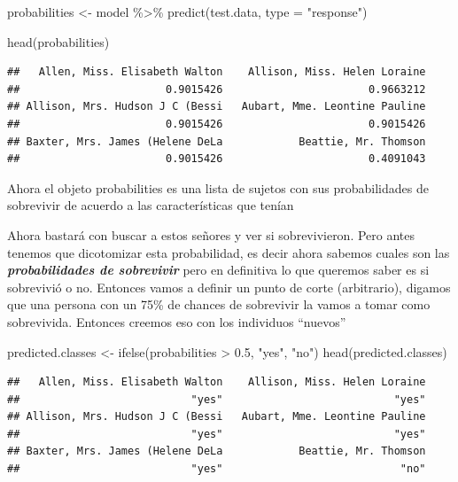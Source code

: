 \documentclass[
]{book}
\newenvironment{Shaded}{\begin{snugshade}}{\end{snugshade}}
\newcommand{\AttributeTok}[1]{\textcolor[rgb]{0.77,0.63,0.00}{#1}}
\newcommand{\FloatTok}[1]{\textcolor[rgb]{0.00,0.00,0.81}{#1}}
\newcommand{\FunctionTok}[1]{\textcolor[rgb]{0.00,0.00,0.00}{#1}}
\newcommand{\NormalTok}[1]{#1}
\newcommand{\OtherTok}[1]{\textcolor[rgb]{0.56,0.35,0.01}{#1}}
\newcommand{\SpecialCharTok}[1]{\textcolor[rgb]{0.00,0.00,0.00}{#1}}
\newcommand{\StringTok}[1]{\textcolor[rgb]{0.31,0.60,0.02}{#1}}
\begin{document}
\begin{Shaded}
\begin{Highlighting}[]
\NormalTok{probabilities }\OtherTok{\textless{}{-}}\NormalTok{ model }\SpecialCharTok{\%\textgreater{}\%} \FunctionTok{predict}\NormalTok{(test.data, }\AttributeTok{type =} \StringTok{"response"}\NormalTok{)}

\FunctionTok{head}\NormalTok{(probabilities)}
\end{Highlighting}
\end{Shaded}

\begin{verbatim}
##   Allen, Miss. Elisabeth Walton    Allison, Miss. Helen Loraine 
##                       0.9015426                       0.9663212 
## Allison, Mrs. Hudson J C (Bessi   Aubart, Mme. Leontine Pauline 
##                       0.9015426                       0.9015426 
## Baxter, Mrs. James (Helene DeLa            Beattie, Mr. Thomson 
##                       0.9015426                       0.4091043
\end{verbatim}

Ahora el objeto probabilities es una lista de sujetos con sus probabilidades de sobrevivir de acuerdo a las características que tenían

Ahora bastará con buscar a estos señores y ver si sobrevivieron. Pero antes tenemos que dicotomizar esta probabilidad, es decir ahora sabemos cuales son las \textbf{\emph{probabilidades de sobrevivir}} pero en definitiva lo que queremos saber es si sobrevivió o no. Entonces vamos a definir un punto de corte (arbitrario), digamos que una persona con un 75\% de chances de sobrevivir la vamos a tomar como sobrevivida. Entonces creemos eso con los individuos ``nuevos''

\begin{Shaded}
\begin{Highlighting}[]
\NormalTok{predicted.classes }\OtherTok{\textless{}{-}} \FunctionTok{ifelse}\NormalTok{(probabilities }\SpecialCharTok{\textgreater{}} \FloatTok{0.5}\NormalTok{, }\StringTok{"yes"}\NormalTok{, }\StringTok{"no"}\NormalTok{)}
\FunctionTok{head}\NormalTok{(predicted.classes)}
\end{Highlighting}
\end{Shaded}

\begin{verbatim}
##   Allen, Miss. Elisabeth Walton    Allison, Miss. Helen Loraine 
##                           "yes"                           "yes" 
## Allison, Mrs. Hudson J C (Bessi   Aubart, Mme. Leontine Pauline 
##                           "yes"                           "yes" 
## Baxter, Mrs. James (Helene DeLa            Beattie, Mr. Thomson 
##                           "yes"                            "no"
\end{verbatim}
\end{document}
